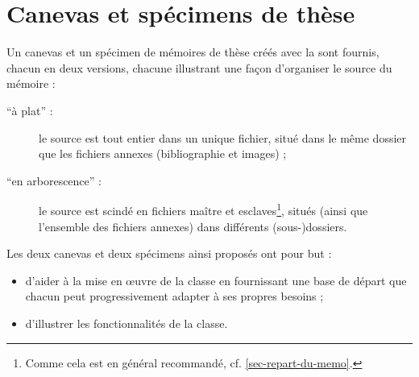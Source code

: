 \chapter{Canevas et spécimens de thèse}\label{cha-specimen-canevas}%
%
%

Un canevas et un spécimen de mémoires de thèse créés avec la \yatCl sont
fournis, chacun en deux versions, chacune illustrant une façon d'organiser le
source  du mémoire :
\begin{description}
\item[\enquote{à plat} :] le source est tout entier dans un unique fichier,
  situé dans le même dossier que les fichiers annexes (bibliographie et
  images) ;
\item[\enquote{en arborescence} :]%
  le source est scindé en fichiers maître et esclaves\footnote{Comme cela est en
    général recommandé, cf. \vref{sec-repart-du-memo}.}, situés (ainsi que
  l'ensemble des fichiers annexes) dans différents (sous-)dossiers.
\end{description}
Les deux canevas et deux spécimens ainsi proposés ont pour but :
\begin{itemize}
\item d'aider à la mise en œuvre de la classe en fournissant une base de départ
  que chacun peut progressivement adapter à ses propres
  besoins ;
\item d'illustrer les fonctionnalités de la classe.
\end{itemize}

